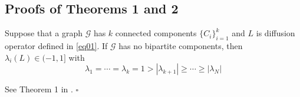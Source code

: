\documentclass{article}
\makeatletter
\newcommand\doubleP{\mathbb{P}}
\newcommand*{\rom}[1]{\expandafter\@slowromancap\romannumeral #1@}
\newenvironment{lemma}[2][Lemma]{\begin{trivlist}
		\item[\hskip \labelsep {\bfseries #1}\hskip \labelsep {\bfseries #2.}]}{\end{trivlist}}
\newenvironment{proof}{{\noindent\it Proof}\quad}{\hfill $\square$\par}
\makeatother
\begin{document}
\begin{appendices}

\section{Proofs of Theorems 1 and 2} \label{appendix:1}

\begin{lemma} 1
Suppose that a graph $\mathcal{G}$ has $k$ connected components $\{C_i\}_{i=1}^k$
and $L$ is diffusion operator defined in \eqref{eq01}.
If $\mathcal{G}$ has no bipartite components, then $\lambda_i(L)\in (-1,1]$ with
$$
\lambda_1 = \cdots = \lambda_k = 1 > |\lambda_{k+1}| \geq \cdots  \geq |\lambda_N|
$$
\end{lemma}

\begin{proof}
See Theorem 1 in \cite{li2018deeper}.
\end{proof}

\end{appendices}
\end{document}
